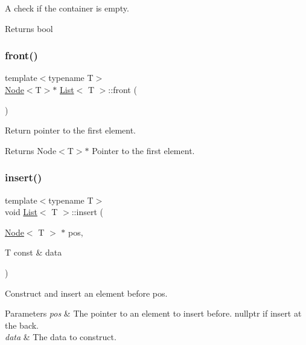 A check if the container is empty. 

\begin{DoxyReturn}{Returns}
bool 
\end{DoxyReturn}
\mbox{\label{classList_a0ea52d2f31cba662a5121ba724a1afc6}} 
\subsubsection{\texorpdfstring{front()}{front()}}
{\footnotesize\ttfamily template$<$typename T$>$ \\
\hyperlink{structNode}{Node}$<$T$>$$\ast$ \hyperlink{classList}{List}$<$ T $>$\+::front (\begin{DoxyParamCaption}{ }\end{DoxyParamCaption})\hspace{0.3cm}{\ttfamily [inline]}}



Return pointer to the first element. 

\begin{DoxyReturn}{Returns}
Node$<$\+T$>$$\ast$ Pointer to the first element. 
\end{DoxyReturn}
\mbox{\label{classList_af583e46c2dad89c3f29be38a52dd27bc}} 
\subsubsection{\texorpdfstring{insert()}{insert()}\hspace{0.1cm}{\footnotesize\ttfamily [1/2]}}
{\footnotesize\ttfamily template$<$typename T$>$ \\
void \hyperlink{classList}{List}$<$ T $>$\+::insert (\begin{DoxyParamCaption}\item[{\hyperlink{structNode}{Node}$<$ T $>$ $\ast$}]{pos,  }\item[{T const \&}]{data }\end{DoxyParamCaption})\hspace{0.3cm}{\ttfamily [inline]}}



Construct and insert an element before pos. 


\begin{DoxyParams}{Parameters}
{\em pos} & The pointer to an element to insert before. nullptr if insert at the back. \\
\hline
{\em data} & The data to construct. \\
\hline
\end{DoxyParams}
\mbox{\label{classList_ac7fcefb285d5b4991be548342f9b86e9}} 
